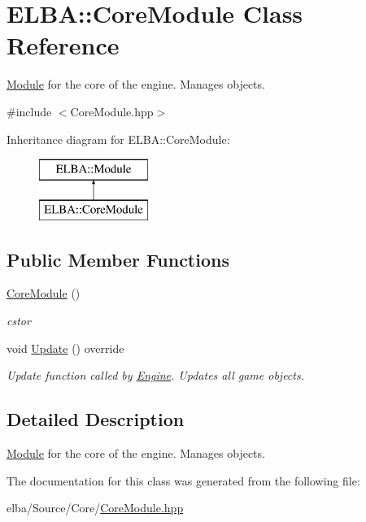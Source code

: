 \hypertarget{class_e_l_b_a_1_1_core_module}{}\section{E\+L\+BA\+:\+:Core\+Module Class Reference}
\label{class_e_l_b_a_1_1_core_module}


\mbox{\hyperlink{class_e_l_b_a_1_1_module}{Module}} for the core of the engine. Manages objects.  




{\ttfamily \#include $<$Core\+Module.\+hpp$>$}

Inheritance diagram for E\+L\+BA\+:\+:Core\+Module\+:\begin{figure}[H]
\begin{center}
\leavevmode
\includegraphics[height=2.000000cm]{class_e_l_b_a_1_1_core_module}
\end{center}
\end{figure}
\subsection*{Public Member Functions}
\begin{DoxyCompactItemize}
\item 
\mbox{\label{class_e_l_b_a_1_1_core_module_a329d759e13e82905d86fc2586977064d}} 
\mbox{\hyperlink{class_e_l_b_a_1_1_core_module_a329d759e13e82905d86fc2586977064d}{Core\+Module}} ()
\begin{DoxyCompactList}\small\item\em cstor \end{DoxyCompactList}\item 
\mbox{\label{class_e_l_b_a_1_1_core_module_a8a1cd3d0a6f1ae195187c45a3cfee744}} 
void \mbox{\hyperlink{class_e_l_b_a_1_1_core_module_a8a1cd3d0a6f1ae195187c45a3cfee744}{Update}} () override
\begin{DoxyCompactList}\small\item\em Update function called by \mbox{\hyperlink{class_e_l_b_a_1_1_engine}{Engine}}. Updates all game objects. \end{DoxyCompactList}\end{DoxyCompactItemize}


\subsection{Detailed Description}
\mbox{\hyperlink{class_e_l_b_a_1_1_module}{Module}} for the core of the engine. Manages objects. 

The documentation for this class was generated from the following file\+:\begin{DoxyCompactItemize}
\item 
elba/\+Source/\+Core/\mbox{\hyperlink{_core_module_8hpp}{Core\+Module.\+hpp}}\end{DoxyCompactItemize}

